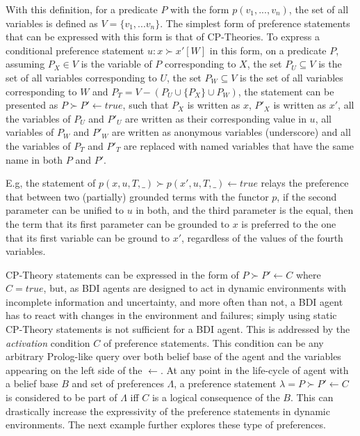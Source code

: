 \documentclass[sigconf,anonymous]{aamas}
\begin{document}
With this definition, for a predicate $P$ with the form $p(v_1,...,v_n)$, the set of all variables is defined as $V = \{v_1,...v_n\}$. The simplest form of preference statements that can be expressed with this form is that of CP-Theories. To express a conditional preference statement $u : x \succ x' [W]$ in this form, on a predicate $P$, assuming $P_X \in V$ is the variable of $P$ corresponding to $X$, the set $P_U \subseteq V$ is the set of all variables corresponding to $U$, the set $P_W \subseteq V$ is the set of all variables corresponding to $W$ and $P_T = V - (P_U \cup \{P_X\} \cup P_W)$, the statement can be presented as $P \succ P' \leftarrow true$, such that $P_X$ is written as $x$, $P'_X$ is written as $x'$, all the variables of $P_U$ and $P'_U$ are written as their corresponding value in $u$, all variables of $P_W$ and $P'_W$ are written as anonymous variables (underscore) and all the variables of $P_T$ and $P'_T$ are replaced with named variables that have the same name in both $P$ and $P'$.


E.g, the statement of $p(x,u,T,\_) \succ p(x',u,T,\_) \leftarrow true$ relays the preference that between two (partially) grounded terms with the functor $p$, if the second parameter can be unified to $u$ in both, and the third parameter is the equal, then the term that its first parameter can be grounded to $x$ is preferred to the one that its first variable can be ground to $x'$, regardless of the values of the fourth variables. 

CP-Theory statements can be expressed in the form of $P \succ P' \leftarrow C$ where $C=true$, but, as BDI agents are designed to act in dynamic environments with incomplete information and uncertainty, and more often than not, a BDI agent has to react with changes in the environment and failures; simply using static CP-Theory statements is not sufficient for a BDI agent. This is addressed by the \textit{activation} condition $C$ of preference statements. This condition can be any arbitrary Prolog-like query over both belief base of the agent and the variables appearing on the left side of the $\leftarrow$. At any point in the life-cycle of agent with a belief base $B$ and set of preferences $\Lambda$, a preference statement $\lambda = P \succ P' \leftarrow C$ is considered to be part of $\Lambda$ iff $C$ is a logical consequence of the $B$. This can drastically increase the expressivity of the preference statements in dynamic environments. The next example further explores these type of preferences.


\end{document}
